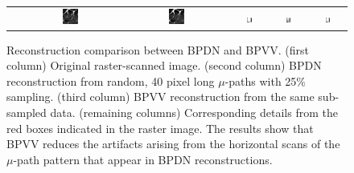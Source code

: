 \documentclass[twocolumn,twoside]{IEEEtran/IEEEtran}
\begin{document}
\begin{figure}[htbp]
\begin{tabular}{cccccc}
                                   & \includegraphics[width=0.16\textwidth]{figures-SBA/dnaforbptv_40mu}		
                                                          & \includegraphics[width=0.16\textwidth]{figures-SBA/dnaforbptv_bptv_40mu}	
                                                                                 & \includegraphics[width=0.16\textwidth]{figures-SBA/dnaforbptv_gt_zoomin}	
                                                                                                                      & \includegraphics[width=0.16\textwidth]{figures-SBA/dnaforbptv_40mu_zoomin}
                                                                                                                                                       & \includegraphics[width=0.16\textwidth]{figures-SBA/dnaforbptv_bptv_40mu_zoomin}		
  \end{tabular}
  \caption{Reconstruction comparison between BPDN and BPVV. (first column)
    Original raster-scanned image. (second column) BPDN reconstruction from
    random, 40 pixel long $\mu$-paths with 25\% sampling. (third column) BPVV
    reconstruction from the same sub-sampled data. (remaining columns)
    Corresponding details from the red boxes indicated in the raster image. The
    results show that BPVV reduces the artifacts arising from the horizontal
    scans of the $\mu$-path pattern that appear in BPDN reconstructions.}
  \label{fig:BPTV_demonstration}
\end{figure}
\endgroup
		
\end{document}
